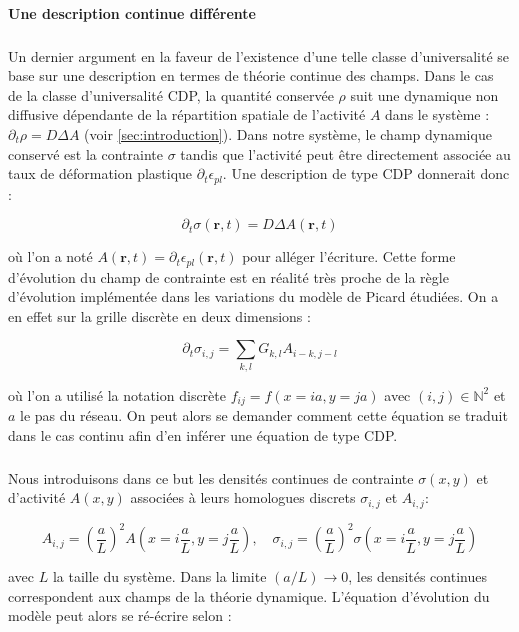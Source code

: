 \paragraph{Une description continue différente}

\subparagraph{}Un dernier argument en la faveur de l'existence d'une telle classe d'universalité se base sur une description en termes de théorie continue des champs. Dans le cas de la classe d'universalité CDP, la quantité conservée $\rho$ suit une dynamique non diffusive dépendante de la répartition spatiale de l'activité $A$ dans le système : $\partial_t \rho = D\Delta A$ (voir \autoref{sec:introduction}). Dans notre système, le champ dynamique conservé est la contrainte $\sigma$ tandis que l'activité peut être directement associée au taux de déformation plastique $\partial_t \epsilon_{pl}$. Une description de type CDP donnerait donc :

\begin{equation}
	\partial_t \sigma(\mathbf{r},t) = D\Delta A(\mathbf{r},t)
\end{equation}

\noindent où l'on a noté $A(\mathbf{r},t) = \partial_t \epsilon_{pl}(\mathbf{r},t)$ pour alléger l'écriture. Cette forme d'évolution du champ de contrainte est en réalité très proche de la règle d'évolution implémentée dans les variations du modèle de Picard étudiées. On a en effet sur la grille discrète en deux dimensions :


\begin{equation}
    \partial_t\sigma_{i,j} = \sum_{k,l}G_{k,l}A_{i-k, j-l}
    \label{eq:1}
\end{equation}

\noindent où l'on a utilisé la notation discrète $f_ {ij}=f(x=ia, y=ja)$ avec $(i,j) \in \mathbb{N}^2$ et $a$ le pas du réseau. On peut alors se demander comment cette équation se traduit dans le cas continu afin d'en inférer une équation de type CDP.

\subparagraph{}Nous introduisons dans ce but les densités continues de contrainte $\sigma (x,y)$ et d'activité $A (x,y)$ associées à leurs homologues discrets  $\sigma_{i, j}$ et $A_{i, j}$:

\begin{equation}
    A_{i, j} = \left( \frac{a}{L} \right)^2A(x=i\frac{a}{L},y=j\frac{a}{L}),\quad
    \sigma_{i, j} = \left( \frac{a}{L} \right)^2\sigma(x=i\frac{a}{L},y=j\frac{a}{L})
\end{equation}

\noindent avec $L$ la taille du système. Dans la limite $(a/L) \rightarrow 0$, les densités continues correspondent aux champs de la théorie dynamique. L'équation d'évolution du modèle peut alors se ré-écrire selon :

